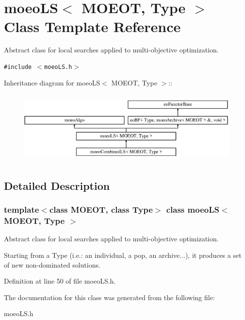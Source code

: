 \section{moeo\-LS$<$ MOEOT, Type $>$ Class Template Reference}
\label{classmoeoLS}
Abstract class for local searches applied to multi-objective optimization.  


{\tt \#include $<$moeo\-LS.h$>$}

Inheritance diagram for moeo\-LS$<$ MOEOT, Type $>$::\begin{figure}[H]
\begin{center}
\leavevmode
\includegraphics[height=3.69637cm]{classmoeoLS}
\end{center}
\end{figure}


\subsection{Detailed Description}
\subsubsection*{template$<$class MOEOT, class Type$>$ class moeo\-LS$<$ MOEOT, Type $>$}

Abstract class for local searches applied to multi-objective optimization. 

Starting from a Type (i.e.: an individual, a pop, an archive...), it produces a set of new non-dominated solutions. 



Definition at line 50 of file moeo\-LS.h.

The documentation for this class was generated from the following file:\begin{CompactItemize}
\item 
moeo\-LS.h\end{CompactItemize}
